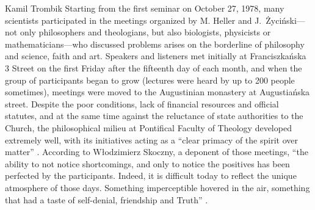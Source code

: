 \begin{artengenv}{Kamil Trombik}
Starting from the first seminar on October 27, 1978, many scientists participated in the meetings organized by M. Heller
and J.~Życiński---not only philosophers and theologians, but also biologists, physicists or mathematicians---who discussed
problems arises on the borderline of philosophy and science, faith and art. Speakers and listeners met initially at
Franciszkańska 3 Street on the first Friday after the fifteenth day of each month, and when the group of participants
began to grow (lectures were heard by up to 200 people sometimes), meetings were moved to the Augustinian monastery at
Augustiańska street. Despite the poor conditions, lack of financial resources and official statutes, and at the same
time against the reluctance of state authorities to the Church, the philosophical milieu at Pontifical Faculty of
Theology developed extremely well, with its initiatives acting as a ``clear primacy of the spirit over matter''
\parencite[p.13]{skoczny_spotkania_1999}.
According to Włodzimierz Skoczny, a deponent of those meetings, ``the
ability to not notice shortcomings, and only to notice the positives has been perfected by the participants. Indeed, it
is difficult today to reflect the unique atmosphere of those days. Something imperceptible hovered in the air,
something that had a taste of self-denial, friendship and Truth''
\parencites[p.15]{skoczny_spotkania_1999}[see also][]{zycinski_kartki_1999}.



\end{artengenv}
